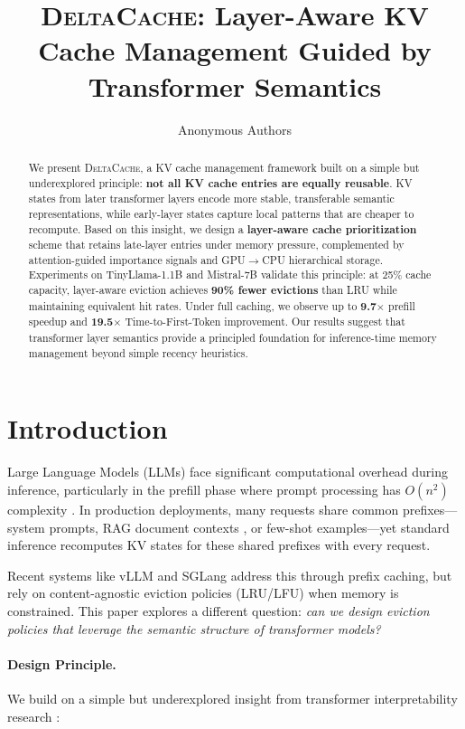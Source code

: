 \documentclass{article}
\title{\textsc{DeltaCache}: Layer-Aware KV Cache Management Guided by Transformer Semantics}
\author{Anonymous Authors}
\newcommand{\deltacache}{\textsc{DeltaCache}}
\begin{document}
\maketitle

\begin{abstract}
We present \deltacache{}, a KV cache management framework built on a simple but underexplored principle: \textbf{not all KV cache entries are equally reusable}.
KV states from later transformer layers encode more stable, transferable semantic representations, while early-layer states capture local patterns that are cheaper to recompute.
Based on this insight, we design a \textbf{layer-aware cache prioritization} scheme that retains late-layer entries under memory pressure, complemented by attention-guided importance signals and GPU$\rightarrow$CPU hierarchical storage.
Experiments on TinyLlama-1.1B and Mistral-7B validate this principle: at 25\% cache capacity, layer-aware eviction achieves \textbf{90\% fewer evictions} than LRU while maintaining equivalent hit rates.
Under full caching, we observe up to \textbf{9.7$\times$} prefill speedup and \textbf{19.5$\times$} Time-to-First-Token improvement.
Our results suggest that transformer layer semantics provide a principled foundation for inference-time memory management beyond simple recency heuristics.
\end{abstract}

\section{Introduction}

Large Language Models (LLMs) face significant computational overhead during inference, particularly in the prefill phase where prompt processing has $O(n^2)$ complexity \citep{kwon2023efficient}.
In production deployments, many requests share common prefixes---system prompts, RAG document contexts \citep{lewis2020retrieval}, or few-shot examples---yet standard inference recomputes KV states for these shared prefixes with every request.

Recent systems like vLLM \citep{kwon2023efficient} and SGLang \citep{zheng2023sglang} address this through prefix caching, but rely on content-agnostic eviction policies (LRU/LFU) when memory is constrained.
This paper explores a different question: \emph{can we design eviction policies that leverage the semantic structure of transformer models?}

\paragraph{Design Principle.}
We build on a simple but underexplored insight from transformer interpretability research \citep{rogers2020primer,elhage2021mathematical}:
\end{document}
